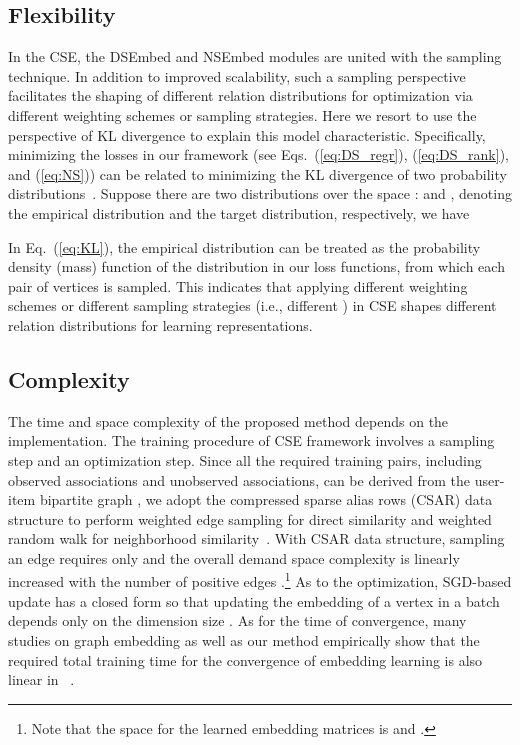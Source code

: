 \documentclass[sigconf,anonymous=false]{acmart}
\begin{document}
\subsection{Flexibility}\label{sec:flex}
In the CSE, the DSEmbed and NSEmbed modules are united
with the sampling technique.
In addition to improved scalability, such a sampling perspective facilitates
the shaping of different relation distributions for optimization via
different weighting schemes or sampling strategies.
Here we resort to use the perspective of KL divergence to explain this model
characteristic.
Specifically, minimizing the losses in our framework (see Eqs.~(\ref{eq:DS_regr}), 
(\ref{eq:DS_rank}), and (\ref{eq:NS})) can be related to
minimizing the KL divergence of two probability distributions~\cite{line}.
Suppose there are two distributions over the space :
 and , denoting the empirical
distribution and the target distribution, respectively, we have

In Eq.~(\ref{eq:KL}), the empirical distribution  can be
treated as the probability density (mass) function of the distribution in our
loss functions, from which each pair of vertices  is sampled.
This indicates that applying different weighting schemes or different sampling
strategies (i.e., different ) in CSE shapes
different relation distributions for learning representations.




\subsection{Complexity}
The time and space complexity of the proposed method depends on the
implementation.
The training procedure of CSE framework involves a sampling step and an
optimization step.
Since all the required training pairs, including observed associations and
unobserved associations, can be derived from the user-item bipartite graph ,
we adopt the compressed sparse alias rows (CSAR) data structure to perform
weighted edge sampling for direct similarity and weighted random walk for
neighborhood similarity~\cite{csar}.
With CSAR data structure, sampling an edge requires only  and
the overall demand space complexity is linearly increased with the number of
positive edges .\footnote{Note that the space for the learned
  embedding matrices  is
   and .}
As to the optimization,
SGD-based update has a closed form so that updating the embedding of a vertex
in a batch depends only on the dimension size .
As for the time of convergence, many studies on graph embedding as well as our
method empirically show that the required total training time for the
convergence of embedding learning is also linear in ~\cite{rare}.
\end{document}
